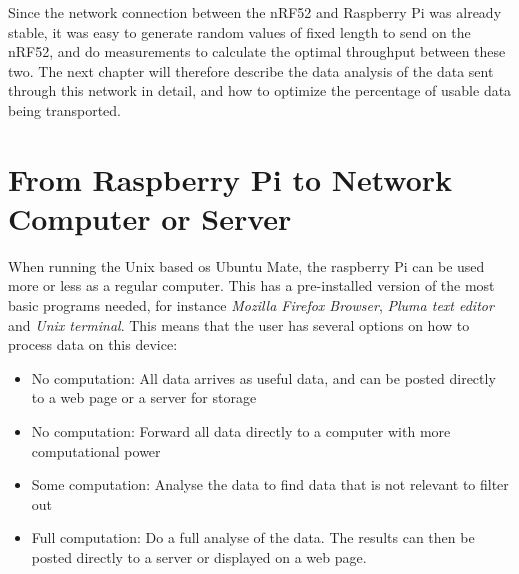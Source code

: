 Since the network connection between the nRF52 and Raspberry Pi was already stable, it was easy to generate random values of fixed length to send on the nRF52, and do measurements to calculate the optimal throughput between these two. The next chapter will therefore describe the data analysis of the data sent through this network in detail, and how to optimize the percentage of usable data being transported.  



\section{From Raspberry Pi to Network Computer or Server}

When running the Unix based \gls{os} Ubuntu Mate, the raspberry Pi can be used more or less as a regular computer. This has a pre-installed version of the most basic programs needed, for instance \textit{Mozilla Firefox Browser}, \textit{Pluma text editor} and \textit{Unix terminal}. This means that the user has several options on how to process data on this device: 

\begin{itemize}
  \item No computation: All data arrives as useful data, and can be posted directly to a web page or a server for storage
  \item No computation: Forward all data directly to a computer with more computational power
  \item Some computation: Analyse the data to find data that is not relevant to filter out
  \item Full computation: Do a full analyse of the data. The results can then be posted directly to a server or displayed on a web page. 
\end{itemize}

